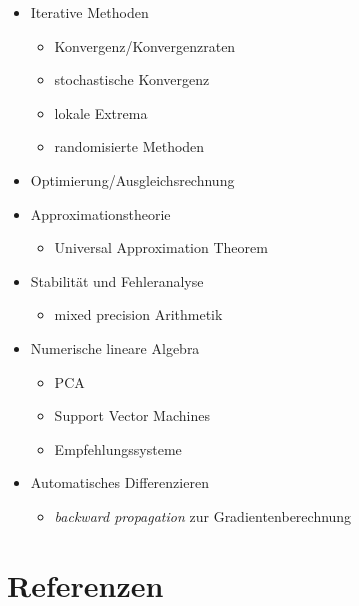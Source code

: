 \documentclass[
]{book}
\providecommand{\tightlist}{%
  \setlength{\itemsep}{0pt}\setlength{\parskip}{0pt}}
\theoremstyle{definition}
\theoremstyle{definition}
\theoremstyle{definition}
\theoremstyle{definition}
\theoremstyle{remark}
\begin{document}
\begin{itemize}
\item
  Iterative Methoden

  \begin{itemize}
  \tightlist
  \item
    Konvergenz/Konvergenzraten
  \item
    stochastische Konvergenz
  \item
    lokale Extrema
  \item
    randomisierte Methoden
  \end{itemize}
\item
  Optimierung/Ausgleichsrechnung
\item
  Approximationstheorie

  \begin{itemize}
  \tightlist
  \item
    Universal Approximation Theorem
  \end{itemize}
\item
  Stabilität und Fehleranalyse

  \begin{itemize}
  \tightlist
  \item
    mixed precision Arithmetik
  \end{itemize}
\item
  Numerische lineare Algebra

  \begin{itemize}
  \tightlist
  \item
    PCA
  \item
    Support Vector Machines
  \item
    Empfehlungssysteme
  \end{itemize}
\item
  Automatisches Differenzieren

  \begin{itemize}
  \tightlist
  \item
    \emph{backward propagation} zur Gradientenberechnung
  \end{itemize}
\end{itemize}

\hypertarget{referenzen}{%
\chapter*{Referenzen}\label{referenzen}}
\end{document}

